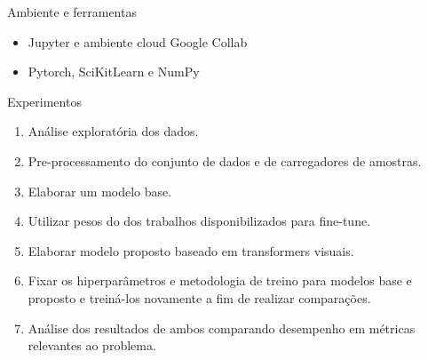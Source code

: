 \documentclass[8pt]{beamer}
\begin{document}
\begin{frame}{Ambiente e ferramentas}
    \begin{itemize}
        \item Jupyter e ambiente cloud Google Collab
        \item Pytorch, SciKitLearn e NumPy
    \end{itemize}




\end{frame}

\begin{frame}{Experimentos}
    \begin{enumerate}
        \item   Análise exploratória dos dados.
        \item   Pre-processamento do conjunto de dados e de carregadores de amostras.
        \item   Elaborar um modelo base.
        \item   Utilizar pesos do dos trabalhos disponibilizados para fine-tune. 
        \item   Elaborar modelo proposto baseado em transformers visuais.
        \item   Fixar os hiperparâmetros e metodologia de treino para modelos base e proposto e treiná-los novamente a fim de realizar comparações.
        \item   Análise dos resultados de ambos comparando desempenho em métricas relevantes ao problema.
        \end{enumerate}
        
\end{frame}
\end{document}
